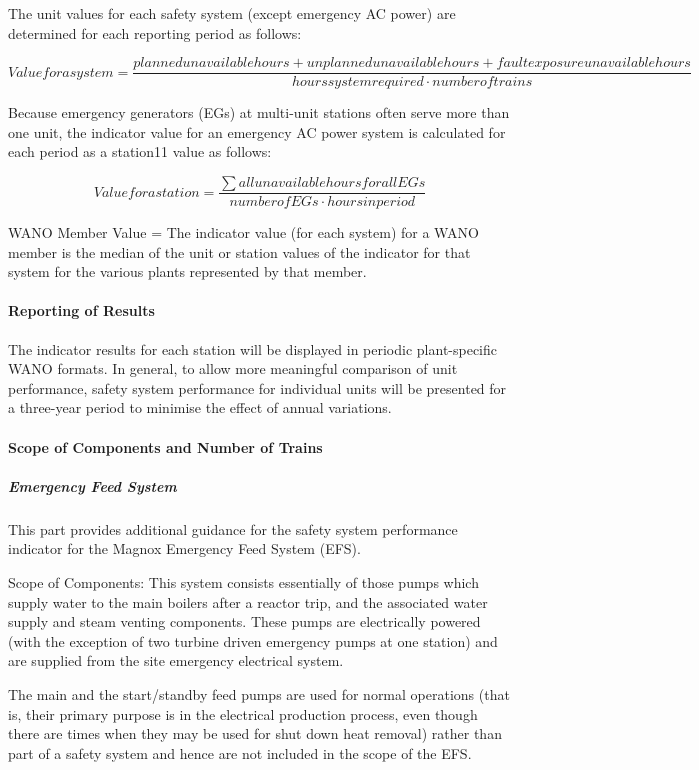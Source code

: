 The unit values for each safety system (except emergency AC power) are
determined for each reporting period as follows:

$$ Value for a system =
\frac{planned unavailable hours+unplanned unavailable hours+fault
exposure unavailable hours}{hours system required \cdot number of
trains} $$

Because emergency generators (EGs) at multi-unit stations often serve
more than one unit, the indicator value for an emergency AC power
system is calculated for each period as a station11 value as follows:

$$ Value for a station = \frac{\sum{all unavailable hours for all
EGs}}{number of EGs \cdot hours in period} $$

WANO Member Value = The indicator value (for each system) for a WANO
member is the median of the unit or station values of the indicator
for that system for the various plants represented by that member.

\paragraph{Reporting of Results}

The indicator results for each station will be displayed in periodic plant-specific WANO formats.
In general, to allow more meaningful comparison of unit performance,
safety system performance for individual units will be presented for a
three-year period to minimise the effect of annual variations.

\paragraph{Scope of Components and Number of Trains}

\subparagraph{Emergency Feed System}

This part provides additional guidance for the safety system
performance indicator for the Magnox Emergency Feed System (EFS).

Scope of Components:  This system consists essentially of those pumps
which supply water to the main boilers after a reactor trip, and the
associated water supply and steam venting components. These pumps are
electrically powered (with the exception of two turbine driven
emergency pumps at one station) and are supplied from the site
emergency electrical system.

The main and the start/standby feed pumps are used for normal
operations (that is, their primary purpose is in the electrical
production process, even though there are times when they may be used
for shut down heat removal) rather than part of a safety system and
hence are not included in the scope of the EFS.

